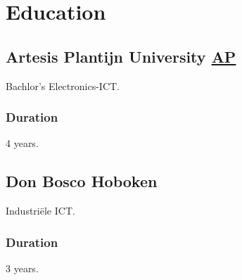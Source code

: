 
\section{Educat\textcolor{mycolor}{ion}}
  \subsection{Artesis Plantijn University \href{https://ap.be}{AP}}
    \hspace*{\fill}{\textcolor{mygrey}{2018-2022}}

    Bachlor's Electronics-ICT.
    \subsubsection{Duration}
      4 years.
   \vspace{.55em}
   \par
  \subsection{Don Bosco Hoboken}
   \hspace*{\fill}{\textcolor{mygrey}{2015-2018}}

    Industriële ICT.
    \subsubsection{Duration}
      3 years.

